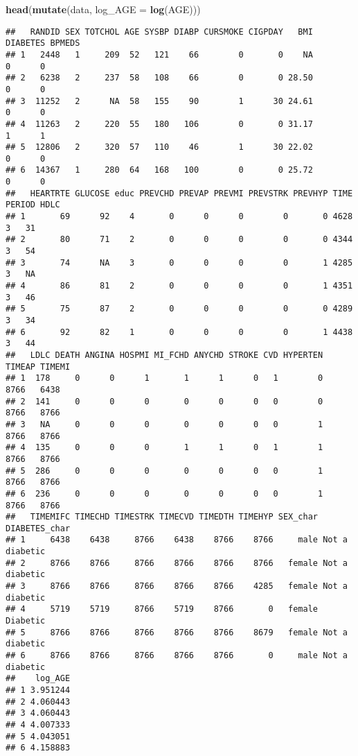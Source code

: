 \documentclass[
]{article}
\newenvironment{Shaded}{\begin{snugshade}}{\end{snugshade}}
\newcommand{\DataTypeTok}[1]{\textcolor[rgb]{0.13,0.29,0.53}{#1}}
\newcommand{\KeywordTok}[1]{\textcolor[rgb]{0.13,0.29,0.53}{\textbf{#1}}}
\newcommand{\NormalTok}[1]{#1}
\begin{document}
\begin{Shaded}
\begin{Highlighting}[]
\KeywordTok{head}\NormalTok{(}\KeywordTok{mutate}\NormalTok{(data, }\DataTypeTok{log_AGE =} \KeywordTok{log}\NormalTok{(AGE)))}
\end{Highlighting}
\end{Shaded}

\begin{verbatim}
##   RANDID SEX TOTCHOL AGE SYSBP DIABP CURSMOKE CIGPDAY   BMI DIABETES BPMEDS
## 1   2448   1     209  52   121    66        0       0    NA        0      0
## 2   6238   2     237  58   108    66        0       0 28.50        0      0
## 3  11252   2      NA  58   155    90        1      30 24.61        0      0
## 4  11263   2     220  55   180   106        0       0 31.17        1      1
## 5  12806   2     320  57   110    46        1      30 22.02        0      0
## 6  14367   1     280  64   168   100        0       0 25.72        0      0
##   HEARTRTE GLUCOSE educ PREVCHD PREVAP PREVMI PREVSTRK PREVHYP TIME PERIOD HDLC
## 1       69      92    4       0      0      0        0       0 4628      3   31
## 2       80      71    2       0      0      0        0       0 4344      3   54
## 3       74      NA    3       0      0      0        0       1 4285      3   NA
## 4       86      81    2       0      0      0        0       1 4351      3   46
## 5       75      87    2       0      0      0        0       0 4289      3   34
## 6       92      82    1       0      0      0        0       1 4438      3   44
##   LDLC DEATH ANGINA HOSPMI MI_FCHD ANYCHD STROKE CVD HYPERTEN TIMEAP TIMEMI
## 1  178     0      0      1       1      1      0   1        0   8766   6438
## 2  141     0      0      0       0      0      0   0        0   8766   8766
## 3   NA     0      0      0       0      0      0   0        1   8766   8766
## 4  135     0      0      0       1      1      0   1        1   8766   8766
## 5  286     0      0      0       0      0      0   0        1   8766   8766
## 6  236     0      0      0       0      0      0   0        1   8766   8766
##   TIMEMIFC TIMECHD TIMESTRK TIMECVD TIMEDTH TIMEHYP SEX_char  DIABETES_char
## 1     6438    6438     8766    6438    8766    8766     male Not a diabetic
## 2     8766    8766     8766    8766    8766    8766   female Not a diabetic
## 3     8766    8766     8766    8766    8766    4285   female Not a diabetic
## 4     5719    5719     8766    5719    8766       0   female       Diabetic
## 5     8766    8766     8766    8766    8766    8679   female Not a diabetic
## 6     8766    8766     8766    8766    8766       0     male Not a diabetic
##    log_AGE
## 1 3.951244
## 2 4.060443
## 3 4.060443
## 4 4.007333
## 5 4.043051
## 6 4.158883
\end{verbatim}
\end{document}
